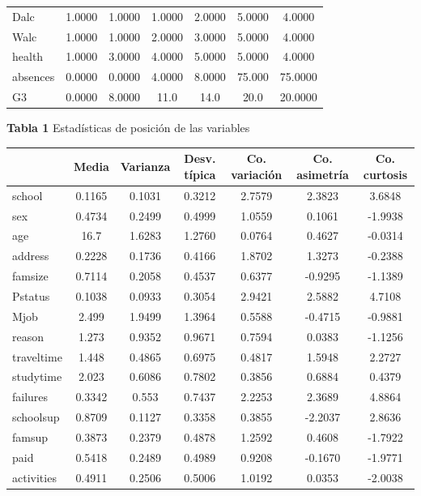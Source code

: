 \documentclass[a4paper, 11pt]{article}
\begin{document}
\begin{center}
\begin{tabular}{lcccccc}
Dalc         & 1.0000 & 1.0000 & 1.0000 & 2.0000 & 5.0000 & 4.0000 \\ 
Walc         & 1.0000 & 1.0000 & 2.0000 & 3.0000 & 5.0000 & 4.0000 \\ 
health       & 1.0000 & 3.0000 & 4.0000 & 5.0000 & 5.0000 & 4.0000 \\ 
absences     & 0.0000 & 0.0000 & 4.0000 & 8.0000 & 75.000 & 75.0000 \\ 
G3           & 0.0000 & 8.0000 & 11.0   & 14.0   & 20.0   & 20.0000 \\ 
\bottomrule
\end{tabular}
\textbf{Tabla 1} Estadísticas de posición de las variables


\centering
\begin{tabular}{lcccccc}
\toprule
& Media & Varianza & Desv. típica & Co. variación & Co. asimetría & Co. curtosis \\ 
\midrule
school       & 0.1165 & 0.1031 & 0.3212 & 2.7579 & 2.3823 & 3.6848 \\ 
sex          & 0.4734 & 0.2499 & 0.4999 & 1.0559 & 0.1061 & -1.9938 \\ 
age          & 16.7   & 1.6283 & 1.2760 & 0.0764 & 0.4627 & -0.0314 \\ 
address      & 0.2228 & 0.1736 & 0.4166 & 1.8702 & 1.3273 & -0.2388 \\ 
famsize      & 0.7114 & 0.2058 & 0.4537 & 0.6377 & -0.9295 & -1.1389 \\ 
Pstatus      & 0.1038 & 0.0933 & 0.3054 & 2.9421 & 2.5882 & 4.7108 \\ 
Mjob         & 2.499  & 1.9499 & 1.3964 & 0.5588 & -0.4715 & -0.9881 \\ 
reason       & 1.273  & 0.9352 & 0.9671 & 0.7594 & 0.0383 & -1.1256 \\ 
traveltime   & 1.448  & 0.4865 & 0.6975 & 0.4817 & 1.5948 & 2.2727 \\ 
studytime    & 2.023  & 0.6086 & 0.7802 & 0.3856 & 0.6884 & 0.4379 \\ 
failures     & 0.3342 & 0.553  & 0.7437 & 2.2253 & 2.3689 & 4.8864 \\ 
schoolsup    & 0.8709 & 0.1127 & 0.3358 & 0.3855 & -2.2037 & 2.8636 \\ 
famsup       & 0.3873 & 0.2379 & 0.4878 & 1.2592 & 0.4608 & -1.7922 \\ 
paid         & 0.5418 & 0.2489 & 0.4989 & 0.9208 & -0.1670 & -1.9771 \\ 
activities   & 0.4911 & 0.2506 & 0.5006 & 1.0192 & 0.0353 & -2.0038 \\ 

\end{tabular}
\end{center}
\end{document}
